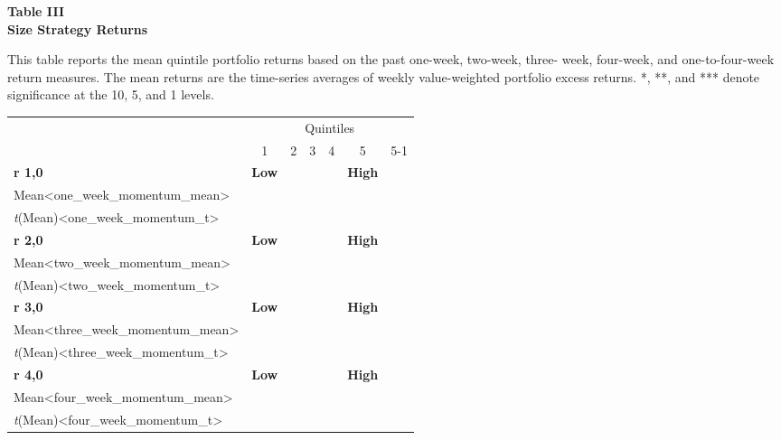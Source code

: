\documentclass{article}
\begin{document}
    \begin{center}
        \textbf{
        Table III
        \\
        Size Strategy Returns
        }
        \begin{justify}
            \footnotesize{
                This table reports the mean quintile portfolio returns based on the past one-week, two-week, three- week, four-week, and one-to-four-week return measures. The mean returns are the time-series averages of weekly value-weighted portfolio excess returns. *, **, and *** denote significance at the 10, 5, and 1 levels.
            }
        \end{justify}
        \-
        \begin{tabular}{lcccccr}
            \toprule
            \multicolumn{1}{c}{} & \multicolumn{6}{c}{Quintiles}
            \\
            \cmidrule(lr){2-7}
            & 1 & 2 & 3 & 4 & 5 & 5-1
            \\
            \midrule
            \multicolumn{1}{l}{\textbf{r 1,0}} & \multicolumn{1}{c}{\textbf{Low}} & \multicolumn{3}{c}{} & \multicolumn{1}{c}{\textbf{High}}
            \\
            Mean<one_week_momentum_mean>
            \\
            \textit{t}(Mean)<one_week_momentum_t>
            \\ [0.2cm]
            \multicolumn{1}{l}{\textbf{r 2,0}} & \multicolumn{1}{c}{\textbf{Low}} & \multicolumn{3}{c}{} & \multicolumn{1}{c}{\textbf{High}}
            \\
            Mean<two_week_momentum_mean>
            \\
            \textit{t}(Mean)<two_week_momentum_t>
            \\ [0.2cm]
            \multicolumn{1}{l}{\textbf{r 3,0}} & \multicolumn{1}{c}{\textbf{Low}} & \multicolumn{3}{c}{} & \multicolumn{1}{c}{\textbf{High}}
            \\
            Mean<three_week_momentum_mean>
            \\
            \textit{t}(Mean)<three_week_momentum_t>
            \\ [0.2cm]
            \multicolumn{1}{l}{\textbf{r 4,0}} & \multicolumn{1}{c}{\textbf{Low}} & \multicolumn{3}{c}{} & \multicolumn{1}{c}{\textbf{High}}
            \\
            Mean<four_week_momentum_mean>
            \\
            \textit{t}(Mean)<four_week_momentum_t>

\end{tabular}
\end{center}
\end{document}
